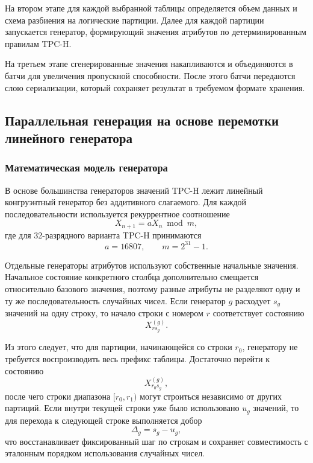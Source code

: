 На втором этапе для каждой выбранной таблицы определяется объем данных и схема
разбиения на логические партиции. Далее для каждой партиции запускается
генератор, формирующий значения атрибутов по детерминированным правилам
TPC-H.

На третьем этапе сгенерированные значения накапливаются и объединяются в батчи
для увеличения пропускной способности. После этого батчи передаются слою
сериализации, который сохраняет результат в требуемом формате хранения.

\subsection{Параллельная генерация на основе перемотки линейного генератора}

\subsubsection{Математическая модель генератора}

В основе большинства генераторов значений TPC-H лежит линейный
конгруэнтный генератор без аддитивного слагаемого. Для каждой последовательности
используется рекуррентное соотношение
\begin{equation}
    X_{n+1} = a X_n \bmod m,
\end{equation}
где для 32-разрядного варианта TPC-H принимаются
\begin{equation}
    a = 16807, \qquad m = 2^{31} - 1.
\end{equation}

Отдельные генераторы атрибутов используют собственные начальные значения. Начальное состояние конкретного столбца
дополнительно смещается относительно базового значения, поэтому разные атрибуты
не разделяют одну и ту же последовательность случайных чисел. Если генератор
$g$ расходует $s_g$ значений на одну строку, то начало строки с номером $r$
соответствует состоянию
\begin{equation}
    X^{(g)}_{r s_g}.
\end{equation}

Из этого следует, что для партиции, начинающейся со строки $r_0$, генератору
не требуется воспроизводить весь префикс таблицы. Достаточно перейти к
состоянию
\begin{equation}
    X^{(g)}_{r_0 s_g},
\end{equation}
после чего строки диапазона $[r_0, r_1)$ могут строиться независимо от других
партиций. Если внутри текущей строки уже было использовано $u_g$ значений, то
для перехода к следующей строке выполняется добор
\begin{equation}
    \Delta_g = s_g - u_g,
\end{equation}
что восстанавливает фиксированный шаг по строкам и сохраняет совместимость с
эталонным порядком использования случайных чисел.

